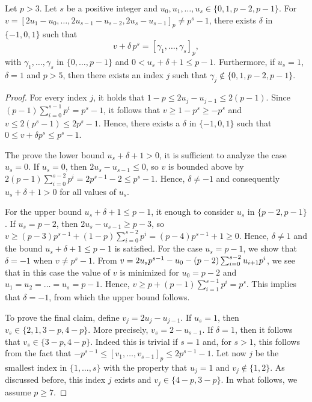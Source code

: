 \documentclass[12pt]{article}
\begin{document}
\begin{lemma}
\label{lem:technical}
Let $p > 3$. Let $s$ be a positive integer and $u_0,u_1,\dots,u_s \in \{0,1,p-2,p-1\}$. For $v = [2u_1-u_0,\dots,2u_{s-1}-u_{s-2},2u_s -u_{s-1}]_p \neq p^s-1$, there exists $\delta$ in $\{-1, 0, 1\}$ such that
\begin{equation*}
v + \delta\,p^s =  [\gamma_1,\dots,\gamma_s]_p,
\end{equation*}
with $\gamma_1, \ldots, \gamma_s$ in $\{0, \ldots, p - 1\}$ and $0 < u_s + \delta + 1 \le p - 1$.
Furthermore, if $u_s = 1$, $\delta = 1$ and $p > 5$, then there exists an index $j$ such that $\gamma_j \not\in \{0, 1, p - 2, p - 1\}$.
\end{lemma}
\begin{proof}
For every index $j$, it holds that $1-p \le 2u_j - u_{j-1} \le 2(p - 1)$.
Since $(p - 1)\sum_{i = 0}^{s - 1} p^i = p^s - 1$, it follows that $v \ge 1 - p^s \ge -p^s$ and $v \le 2(p^s - 1) \le 2p^s - 1$.
Hence, there exists a $\delta$ in $\{-1, 0, 1\}$ such that $0 \le v + \delta p^s \le p^s - 1$.

The prove the lower bound $u_s + \delta + 1 > 0$, it is sufficient to analyze the case $u_s = 0$.
If $u_s = 0$, then $2u_s - u_{s-1} \leq 0$, so $v$ is bounded above by $2(p - 1)\sum_{i=0}^{s-2} p^i = 2 p^{s-1} - 2 \leq p^s-1$. Hence, $\delta \neq -1$ and consequently $u_s + \delta + 1 > 0$ for all values of $u_s$.

For the upper bound $u_s + \delta + 1 \le p - 1$, it enough to consider $u_s$ in $\{p - 2, p - 1\}$. If $u_s = p-2$, then $2u_s - u_{s-1} \geq p-3$, so $v \ge (p-3)p^{s-1} + (1 - p)\sum_{i=0}^{s-2} p^i = (p-4)p^{s-1} + 1 \geq 0$. Hence, $\delta \neq 1$ and the bound $u_s + \delta + 1 \le p - 1$ is satisfied. For the case $u_s = p - 1$, we show that $\delta = -1$ when $v \neq p^s - 1$. From $v = \smash{2u_s p^{s - 1} - u_0 - (p - 2) \sum_{i = 0}^{s - 2} u_{i + 1} p^i}$, we see that in this case the value of $v$ is minimized for $u_0 = p - 2$ and $u_1 = u_2 = \ldots = u_s = p - 1$. Hence, $v \ge p + (p - 1)\sum_{i = 1}^{s - 1} p^i = p^s$. This implies that $\delta = -1$, from which the upper bound follows.


To prove the final claim, define $v_j = 2u_j - u_{j-1}$. If $u_s = 1$, then $v_s \in \{2,1,3-p,4-p\}$. More precisely, $v_s = 2 - u_{s - 1}$.
If $\delta = 1$, then it follows that $v_s \in \{3-p,4-p\}$. Indeed this is trivial if $s= 1$ and, for $s>1$, this follows from the fact that $-p^{s-1} \leq [v_1,\dots,v_{s-1}]_p \leq 2p^{s-1}-1$. Let now $j$ be the smallest index in $\{1,\dots,s\}$ with the property that $u_j = 1$ and $v_{j} \notin \{1,2\}$. As discussed before, this index $j$ exists and $v_{j} \in \{4-p,3-p\}$. In what follows, we assume $p\geq7$.


\end{proof}
\end{document}
